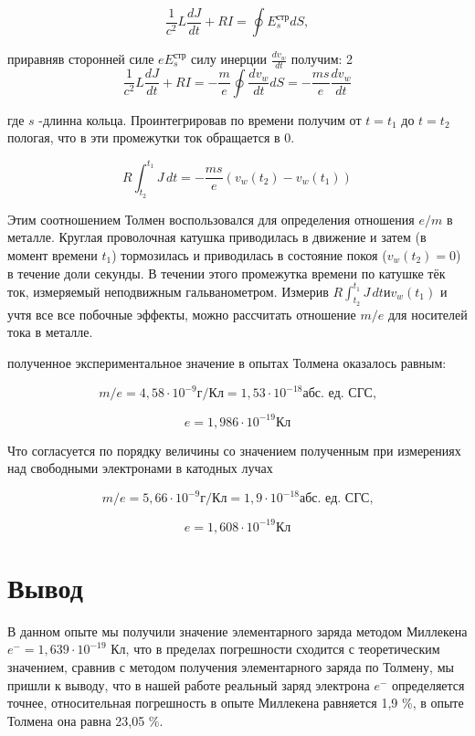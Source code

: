\documentclass[a4paper,12pt]{article} %
\begin{document}
\begin{equation}
    \frac{1}{c^{2}}L\frac{dJ}{dt} +RI  = \oint{E^{\text{стр}}_{s}}dS,
\end{equation}

приравняв сторонней силе $ eE^{\text{стр}}_{s}$ силу инерции $\frac{dv_{w}}{dt}$ получим:
2
\begin{equation}
    \frac{1}{c^{2}}L\frac{dJ}{dt} +RI  = - \frac{m}{e} \oint{\frac{dv_{w}}{dt}}dS = - \frac{ms}{e} \frac{dv_{w}}{dt}
\end{equation}

где $s$ -длинна кольца. Проинтегрировав по времени получим от $t = t_1$ до $t = t_2$ пологая, что в эти промежутки ток обращается в 0.

\begin{equation}
 R\int_{t_2}^{t_1} J \,dt = - \frac{ms}{e} (v_{w}(t_2) - v_{w}(t_1))
\end{equation}

Этим соотношением Толмен воспользовался для определения отношения $e/m$ в металле. Круглая проволочная катушка приводилась в движение и затем (в момент времени $t_1$) тормозилась и приводилась в состояние покоя ($v_{w}(t_2) = 0$) в течение доли секунды. В течении этого промежутка времени по катушке тёк ток, измеряемый неподвижным гальванометром. Измерив $R\int_{t_2}^{t_1} J \,dt и v_{w}(t_1)$ и учтя все все побочные эффекты, можно рассчитать отношение $m/e$ для носителей тока в металле.

полученное экспериментальное значение в опытах Толмена оказалось равным:

\begin{equation}
m/e = 4,58 \cdot 10^{-9} \text{г/Кл} = 1,53 \cdot 10^{-18} \text{абс. ед. СГС,}
\end{equation}

\begin{equation}
e = 1,986\cdot 10^{-19} \text{Кл}
\end{equation}

Что согласуется по порядку величины со значением полученным при измерениях над свободными электронами в катодных лучах


\begin{equation}
m/e = 5,66 \cdot 10^{-9} \text{г/Кл}  = 1,9 \cdot 10^{-18} \text{абс. ед. СГС,}
\end{equation}

\begin{equation}
e = 1,608\cdot 10^{-19} \text{Кл}
\end{equation}

\section{Вывод}
В данном опыте мы получили значение элементарного заряда методом Миллекена $e^{-} = 1,639 \cdot10^{-19} \text{ Кл}$, что в пределах погрешности сходится с теоретическим значением, сравнив с методом получения элементарного заряда по Толмену, мы пришли к выводу, что в нашей работе реальный заряд электрона $e^{-}$ определяется точнее, относительная погрешность в опыте Миллекена равняется 1,9 \%, в опыте Толмена она равна 23,05 \%. 
\end{document}
